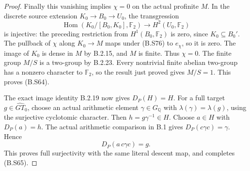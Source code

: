\begin{proof}
Finally this vanishing implies $\chi=0$ on the actual
profinite $M$.  In the discrete source extension
$K_0\to B_0\to U_0$, the transgression
\[
 \operatorname{Hom}(K_0/[B_0,K_0],\mathbb F_2)
                     \longrightarrow H^2(U_0,\mathbb F_2)
                                                               \tag{B.S76}
\]
is injective: the preceding restriction from
$H^1(B_0,\mathbb F_2)$ is zero, since
$K_0\subseteq B_0'$.  The pullback of $\chi$ along
$K_0\to M$ maps under (B.S76) to $e_\chi$, so it is
zero.  The image of $K_0$ is dense in $M$ by B.2.15,
and $M$ is finite.  Thus $\chi=0$.
The finite group $M/S$ is a two-group by B.2.23.
Every nontrivial finite abelian two-group has a
nonzero character to $\mathbb F_2$, so the result
just proved gives $M/S=1$.  This proves (B.S64).

The exact image identity B.2.19 now gives
$D_P(H)=H$.  For a full target $g\in\widehat{GT}_0$,
choose an actual arithmetic element $\gamma\in G_{\mathbb Q}$
with $\lambda(\gamma)=\lambda(g)$, using the surjective
cyclotomic character.  Then $h=g\gamma^{-1}\in H$.
Choose $a\in H$ with $D_P(a)=h$.  The actual arithmetic
comparison in B.1 gives
$D_P(c\gamma c)=\gamma$.  Hence
\[
                        D_P(a\,c\gamma c)=g.                \tag{B.S77}
\]
This proves full surjectivity with the same literal
descent map, and completes (B.S65).
\end{proof}
